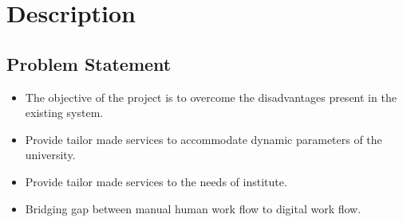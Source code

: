 \chapter{Description}
\section{Problem Statement}
\begin{itemize}
\item The objective of the project is to overcome the disadvantages present in the existing system.
\item Provide tailor made services to accommodate dynamic parameters of the university.
\item Provide tailor made services to the needs of institute.
\item Bridging gap between manual human work flow to digital work flow.
\end{itemize}
